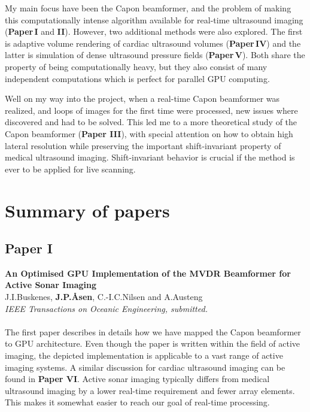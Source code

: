 My main focus have been the Capon beamformer, and the problem of making this computationally intense algorithm available for real-time ultrasound imaging (\textbf{Paper\,I} and \textbf{II}). However, two additional methods were also explored. The first is adaptive volume rendering of cardiac ultrasound volumes (\textbf{Paper\,IV}) and the latter is simulation of dense ultrasound pressure fields (\textbf{Paper\,V}). Both share the property of being computationally heavy, but they also consist of many independent computations which is perfect for parallel GPU computing. 

Well on my way into the project, when a real-time Capon beamformer was realized, and loops of images for the first time were processed, new issues where discovered and had to be solved. This led me to a more theoretical study of the Capon beamformer (\textbf{Paper III}), with special attention on how to obtain high lateral resolution while preserving the important shift-invariant property of medical ultrasound imaging. Shift-invariant behavior is crucial if the method is ever to be applied for live scanning. 



\section{Summary of papers}

\subsection{Paper I}
\textbf{An Optimised GPU Implementation of the MVDR Beamformer for Active Sonar Imaging}\\
J.\:I.\:Buskenes, \textbf{J.\:P.\:\AA{}sen}, C.-I.\:C.\:Nilsen and A.\:Austeng\\
{\it IEEE Transactions on Oceanic Engineering, submitted.}\\\\
The first paper describes in details how we have mapped the Capon beamformer to GPU architecture. Even though the paper is written within the field of active  imaging, the depicted implementation is applicable to a vast range of active imaging systems. A similar discussion for cardiac ultrasound imaging can be found in \textbf{Paper VI}.  Active sonar imaging typically differs from medical ultrasound imaging by a lower real-time requirement and fewer array elements. This makes it somewhat easier to reach our goal of real-time processing. 

